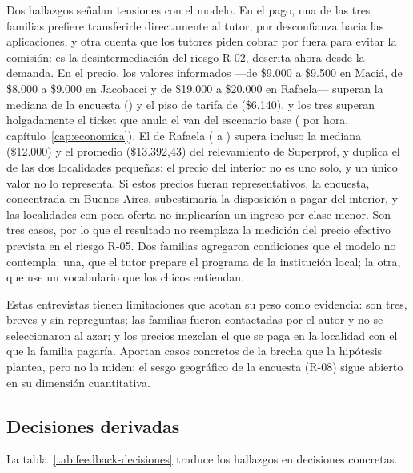 Dos hallazgos señalan tensiones con el modelo. En el pago, una de las
tres familias prefiere transferirle directamente al tutor, por
desconfianza hacia las aplicaciones, y otra cuenta que los tutores
piden cobrar por fuera para evitar la comisión: es la desintermediación
del riesgo R-02, descrita ahora desde la demanda. En el precio, los
valores informados ---de \$9.000 a \$9.500 en Maciá, de \$8.000 a
\$9.000 en Jacobacci y de \$19.000 a \$20.000 en Rafaela--- superan la
mediana de la encuesta () y el piso de tarifa de 
(\$6.140), y los tres superan holgadamente el ticket que anula el
\gls{van} del escenario base ( por hora,
capítulo~\ref{cap:economica}). El de Rafaela ( a ) supera incluso la
mediana (\$12.000) y el promedio (\$13.392,43) del relevamiento de
Superprof, y duplica el de las dos localidades pequeñas: el precio del
interior no es uno solo, y un único valor no lo representa. Si estos precios fueran representativos, la encuesta, concentrada
en Buenos Aires, subestimaría la disposición a pagar del interior, y las
localidades con poca oferta no implicarían un ingreso por clase menor.
Son tres casos, por lo que el resultado no reemplaza la medición del
precio efectivo prevista en el riesgo R-05. Dos familias agregaron
condiciones que el modelo no contempla: una, que el tutor prepare el
programa de la institución local; la otra, que use un vocabulario que
los chicos entiendan.

Estas entrevistas tienen limitaciones que acotan su peso como evidencia:
son tres, breves y sin repreguntas; las familias fueron contactadas por
el autor y no se seleccionaron al azar; y los precios mezclan el que se
paga en la localidad con el que la familia pagaría. Aportan casos
concretos de la brecha que la hipótesis plantea, pero no la miden: el
sesgo geográfico de la encuesta (R-08) sigue abierto en su dimensión
cuantitativa.

\subsection{Decisiones derivadas}

La tabla~\ref{tab:feedback-decisiones} traduce los hallazgos en
decisiones concretas.

